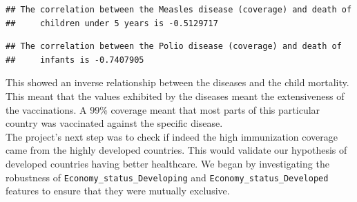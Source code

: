 \documentclass[
  10pt,
]{article}
\newenvironment{Shaded}{\begin{snugshade}}{\end{snugshade}}
\newcommand{\AttributeTok}[1]{\textcolor[rgb]{0.13,0.29,0.53}{#1}}
\newcommand{\CommentTok}[1]{\textcolor[rgb]{0.56,0.35,0.01}{\textit{#1}}}
\newcommand{\FunctionTok}[1]{\textcolor[rgb]{0.13,0.29,0.53}{\textbf{#1}}}
\newcommand{\NormalTok}[1]{#1}
\newcommand{\OtherTok}[1]{\textcolor[rgb]{0.56,0.35,0.01}{#1}}
\newcommand{\SpecialCharTok}[1]{\textcolor[rgb]{0.81,0.36,0.00}{\textbf{#1}}}
\newcommand{\StringTok}[1]{\textcolor[rgb]{0.31,0.60,0.02}{#1}}
\begin{document}
\begin{verbatim}
## The correlation between the Measles disease (coverage) and death of
##     children under 5 years is -0.5129717
\end{verbatim}

\begin{Shaded}
\end{Shaded}

\begin{verbatim}
## The correlation between the Polio disease (coverage) and death of
##     infants is -0.7407905
\end{verbatim}

This showed an inverse relationship between the diseases and the child
mortality. This meant that the values exhibited by the diseases meant
the extensiveness of the vaccinations. A 99\% coverage meant that most
parts of this particular country was vaccinated against the specific
disease.\\

The project's next step was to check if indeed the high immunization
coverage came from the highly developed countries. This would validate
our hypothesis of developed countries having better healthcare. We began
by investigating the robustness of \texttt{Economy\_status\_Developing}
and \texttt{Economy\_status\_Developed} features to ensure that they
were mutually exclusive.\\

\begin{Shaded}
\end{Shaded}
\end{document}
